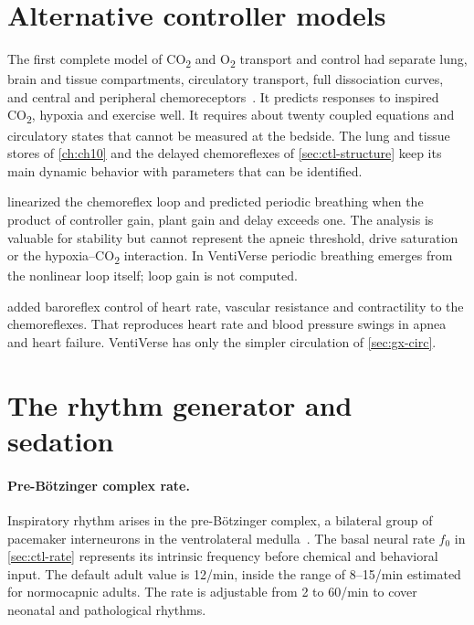 \section{Alternative controller models}
\label{sec:ctl-alt}
\begin{description}[leftmargin=1em]
  \item[Grodins.] The first complete model of CO\textsubscript{2} and O\textsubscript{2} transport and control had separate lung, brain and tissue compartments, circulatory transport, full dissociation curves, and central and peripheral chemoreceptors~\citep{grodins1967}. It predicts responses to inspired CO\textsubscript{2}, hypoxia and exercise well. It requires about twenty coupled equations and circulatory states that cannot be measured at the bedside. The lung and tissue stores of \cref{ch:ch10} and the delayed chemoreflexes of \cref{sec:ctl-structure} keep its main dynamic behavior with parameters that can be identified.
  \item[Loop gain.] \citet{khoo1982} linearized the chemoreflex loop and predicted periodic breathing when the product of controller gain, plant gain and delay exceeds one. The analysis is valuable for stability but cannot represent the apneic threshold, drive saturation or the hypoxia--CO\textsubscript{2} interaction. In VentiVerse periodic breathing emerges from the nonlinear loop itself; loop gain is not computed.
  \item[Cardiorespiratory models.] \citet{ursino2000} added baroreflex control of heart rate, vascular resistance and contractility to the chemoreflexes. That reproduces heart rate and blood pressure swings in apnea and heart failure. VentiVerse has only the simpler circulation of \cref{sec:gx-circ}.
\end{description}

\section{The rhythm generator and sedation}
\label{sec:ctl-prebotc}
\paragraph{Pre-B\"otzinger complex rate.} Inspiratory rhythm arises in the pre-B\"otzinger complex, a bilateral group of pacemaker interneurons in the ventrolateral medulla~\citep{smith1991,feldman2013}. The basal neural rate $f_0$ in \cref{sec:ctl-rate} represents its intrinsic frequency before chemical and behavioral input. The default adult value is 12/min, inside the range of 8--15/min estimated for normocapnic adults. The rate is adjustable from 2 to 60/min to cover neonatal and pathological rhythms.

